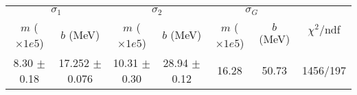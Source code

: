 \begin{tabular}{cc|cc|cc||c}
\multicolumn{2}{c|}{$\sigma_1$} & \multicolumn{2}{|c}{$\sigma_2$} & \multicolumn{2}{|c}{$\sigma_G$}  & \multirow{2}{*}{$\chi^2/$ndf}\\
$m$ ($\times1e5$) & $b$ (MeV) & $m$ ($\times1e5$) & $b$ (MeV) & $m$ ($\times1e5$) & $b$ (MeV) & \\
\hline
8.30 $\pm$ 0.18 & 17.252 $\pm$ 0.076 & 10.31 $\pm$ 0.30 & 28.94 $\pm$ 0.12 & 16.28 & 50.73 & 1456/197\\
\end{tabular}
